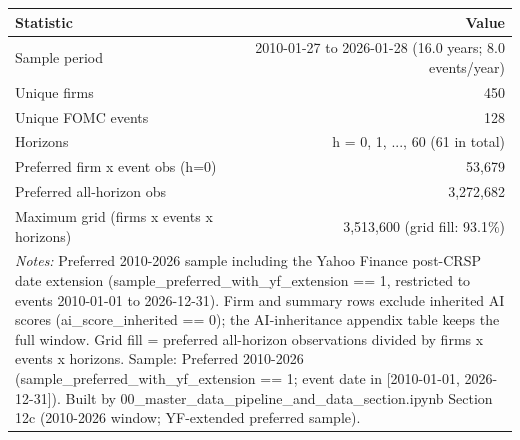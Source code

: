 \begin{tabular}{lr}
\toprule
Statistic & Value \\
\midrule
Sample period & 2010-01-27 to 2026-01-28 (16.0 years; 8.0 events/year) \\
Unique firms & 450 \\
Unique FOMC events & 128 \\
Horizons & h = 0, 1, ..., 60 (61 in total) \\
Preferred firm x event obs (h=0) & 53,679 \\
Preferred all-horizon obs & 3,272,682 \\
Maximum grid (firms x events x horizons) & 3,513,600 (grid fill: 93.1\%) \\
\bottomrule
\multicolumn{2}{p{0.95\linewidth}}{\footnotesize \textit{Notes:} Preferred 2010-2026 sample including the Yahoo Finance post-CRSP date extension (sample\_preferred\_with\_yf\_extension == 1, restricted to events 2010-01-01 to 2026-12-31). Firm and summary rows exclude inherited AI scores (ai\_score\_inherited == 0); the AI-inheritance appendix table keeps the full window. Grid fill = preferred all-horizon observations divided by firms x events x horizons. Sample: Preferred 2010-2026 (sample\_preferred\_with\_yf\_extension == 1; event date in [2010-01-01, 2026-12-31]). Built by 00\_master\_data\_pipeline\_and\_data\_section.ipynb Section 12c (2010-2026 window; YF-extended preferred sample).} \\
\end{tabular}
